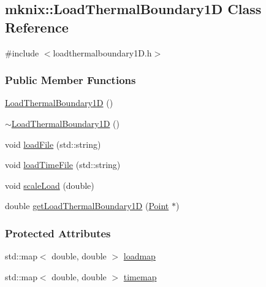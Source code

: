 \hypertarget{classmknix_1_1_load_thermal_boundary1_d}{}\subsection{mknix\+:\+:Load\+Thermal\+Boundary1\+D Class Reference}
\label{classmknix_1_1_load_thermal_boundary1_d}


{\ttfamily \#include $<$loadthermalboundary1\+D.\+h$>$}

\subsubsection*{Public Member Functions}
\begin{DoxyCompactItemize}
\item 
\hyperlink{classmknix_1_1_load_thermal_boundary1_d_a51f4d29e70055f5fa78f82c71ef25656}{Load\+Thermal\+Boundary1\+D} ()
\item 
\hyperlink{classmknix_1_1_load_thermal_boundary1_d_aceee51743b0dba59f9e12d642763e01b}{$\sim$\+Load\+Thermal\+Boundary1\+D} ()
\item 
void \hyperlink{classmknix_1_1_load_thermal_boundary1_d_a7336f5105ac41491bd4bd70fdfde0b3d}{load\+File} (std\+::string)
\item 
void \hyperlink{classmknix_1_1_load_thermal_boundary1_d_a3f625c0d6749be04fc2ede8cfd347867}{load\+Time\+File} (std\+::string)
\item 
void \hyperlink{classmknix_1_1_load_thermal_boundary1_d_ae7129a0346da49e5e5f76639ff6dd374}{scale\+Load} (double)
\item 
double \hyperlink{classmknix_1_1_load_thermal_boundary1_d_a28be37a4ae82bde77b7dd048d36503f5}{get\+Load\+Thermal\+Boundary1\+D} (\hyperlink{classmknix_1_1_point}{Point} $\ast$)
\end{DoxyCompactItemize}
\subsubsection*{Protected Attributes}
\begin{DoxyCompactItemize}
\item 
std\+::map$<$ double, double $>$ \hyperlink{classmknix_1_1_load_thermal_boundary1_d_a03eb9775cf1bfa0bcf820745d8be8644}{loadmap}
\item 
std\+::map$<$ double, double $>$ \hyperlink{classmknix_1_1_load_thermal_boundary1_d_aeb87f140777fb85fc880ced7aa78d25f}{timemap}
\end{DoxyCompactItemize}


